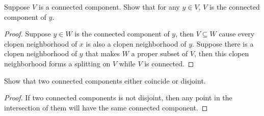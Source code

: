 \documentclass[./main.tex]{subfiles}
\begin{document}
\begin{lemma}
  Suppose $V$ is a connected component. Show that for any $y \in V$,
  $V$ is the connected component of $y$.
\end{lemma}
\begin{proof}
  Suppose $y \in W$ is the connected component of $y$, then $V \subseteq W$
  cause every clopen neighborhood of $x$ is also a clopen neighborhood of $y$.
  Suppose there is a clopen neighborhood of $y$ that makes $W$ a proper subset of $V$,
  then this clopen neighborhood forms a splitting on $V$ while $V$ is connected.
\end{proof}

\begin{theorem}
  Show that two connected components either coincide or disjoint.
\end{theorem}
\begin{proof}
  If two connected components is not disjoint, then any point in the intersection of them
  will have the same connected component.
\end{proof}
\end{document}

